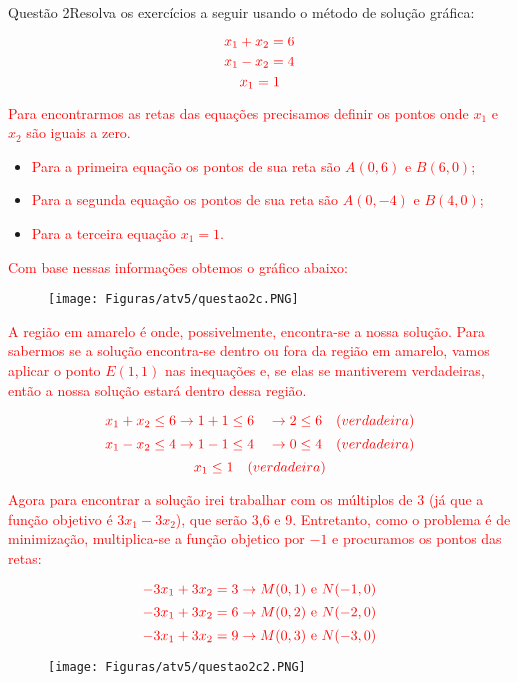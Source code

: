 \documentclass[12pt]{article}
\begin{document}
\begin{section}{Questão 2}{Resolva os exercícios a seguir usando o método de solução gráfica:}
\begin{itemize}
$$
\textcolor{red}{x_1 + x_2= 6}
$$
$$
\textcolor{red}{x_1 - x_2 = 4}
$$
$$
\textcolor{red}{x_1 = 1}
$$

\textcolor{red}{Para encontrarmos as retas das equações precisamos definir os pontos onde $x_1$ e $x_2$ são iguais a zero. }

\begin{itemize}
    \item \textcolor{red}{Para a primeira equação os pontos de sua reta são $A(0,6)$ e $B(6,0)$;}
    
    \item \textcolor{red}{Para a segunda equação os pontos de sua reta são $A(0,-4)$ e $B(4,0)$;}
    
     \item \textcolor{red}{Para a terceira equação $x_1 = 1$.}
\end{itemize}

 \textcolor{red}{Com base nessas informações obtemos o gráfico abaixo:}
 
 \begin{figure}[H]
    \centering
    \texttt{[image: Figuras/atv5/questao2c.PNG]}
\end{figure}
 
 \textcolor{red}{A região em amarelo é onde, possivelmente, encontra-se a nossa solução. Para sabermos se a solução encontra-se dentro ou fora da região em amarelo, vamos aplicar o ponto $E(1,1)$ nas inequações e, se elas se mantiverem verdadeiras, então a nossa solução estará dentro dessa região.}
 
 $$
\textcolor{red}{x_1 + x_2 \leq 6 \rightarrow 1 + 1 \leq 6 \quad \rightarrow 2 \leq 6 \quad \textrm(verdadeira)}
$$
$$
\textcolor{red}{x_1 - x_2 \leq 4 \rightarrow 1 - 1 \leq 4 \quad \rightarrow 0 \leq 4 \quad \textrm(verdadeira)}
$$
$$
\textcolor{red}{x_1 \leq 1 \quad \textrm(verdadeira)}
$$

\textcolor{red}{Agora para encontrar a solução irei trabalhar com os múltiplos de 3 (já que a função objetivo é $3x_1 - 3x_2$), que serão 3,6 e 9. Entretanto, como o problema é de minimização, multiplica-se a função objetico por $-1$ e procuramos os pontos das retas:}

$$
\textcolor{red}{-3x_1 + 3x_2 = 3 \rightarrow M(0,1) \textrm{ e } N(-1,0)}
$$
$$
\textcolor{red}{-3x_1 + 3x_2 = 6 \rightarrow M(0,2) \textrm{ e } N(-2,0)}
$$
$$
\textcolor{red}{-3x_1 + 3x_2 = 9 \rightarrow M(0,3) \textrm{ e } N(-3,0)}
$$

 \begin{figure}[H]
    \centering
    \texttt{[image: Figuras/atv5/questao2c2.PNG]}
\end{figure}


\end{itemize}
\end{section}
\end{document}
